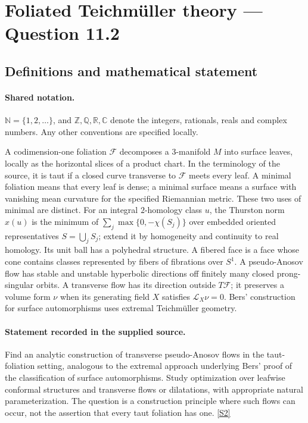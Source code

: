 \documentclass[11pt]{article}
\newcommand{\sref}[2]{\hyperlink{source:#1:#2}{[S#2]}}
\begin{document}
\section{Foliated Teichmüller theory — Question 11.2}\label{statement}

\subsection{Definitions and mathematical statement}

\paragraph{Shared notation.}$\mathbb N=\{1,2,\ldots\}$, and $\mathbb Z,\mathbb Q,\mathbb R,\mathbb C$ denote the integers, rationals, reals and complex numbers. Any other conventions are specified locally.


A codimension-one foliation $\mathcal F$ decomposes a $3$-manifold $M$ into surface leaves, locally as the horizontal slices of a product chart. In the terminology of the source, it is taut if a closed curve transverse to $\mathcal F$ meets every leaf. A minimal foliation means that every leaf is dense; a minimal surface means a surface with vanishing mean curvature for the specified Riemannian metric. These two uses of minimal are distinct. For an integral $2$-homology class $u$, the Thurston norm $x(u)$ is the minimum of $\sum_j\max\{0,-\chi(S_j)\}$ over embedded oriented representatives $S=\bigcup_j S_j$; extend it by homogeneity and continuity to real homology. Its unit ball has a polyhedral structure. A fibered face is a face whose cone contains classes represented by fibers of fibrations over $S^1$. A pseudo-Anosov flow has stable and unstable hyperbolic directions off finitely many closed prong-singular orbits. A transverse flow has its direction outside $T\mathcal F$; it preserves a volume form $\nu$ when its generating field $X$ satisfies $\mathcal L_X\nu=0$. Bers' construction for surface automorphisms uses extremal Teichm\"uller geometry.
\paragraph{Statement recorded in the supplied source.}
Find an analytic construction of transverse pseudo-Anosov flows in the taut-foliation setting, analogous to the extremal approach underlying Bers' proof of the classification of surface automorphisms. Study optimization over leafwise conformal structures and transverse flows or dilatations, with appropriate natural parameterization. The question is a construction principle where such flows can occur, not the assertion that every taut foliation has one. \sref{statement}{2}
\end{document}

